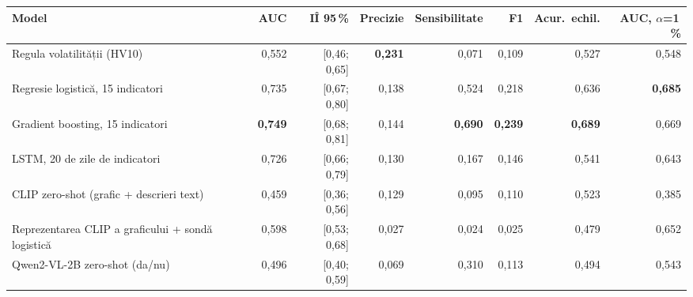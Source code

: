 \begin{tabular}{lrrrrrrr}
\toprule
Model & AUC & IÎ 95\,\% & Precizie & Sensibilitate & F1 & Acur.\ echil. & AUC, $\alpha$=1\,\% \\
\midrule
Regula volatilității (HV10) & 0,552 & [0,46; 0,65] & \textbf{0,231} & 0,071 & 0,109 & 0,527 & 0,548 \\
Regresie logistică, 15 indicatori & 0,735 & [0,67; 0,80] & 0,138 & 0,524 & 0,218 & 0,636 & \textbf{0,685} \\
Gradient boosting, 15 indicatori & \textbf{0,749} & [0,68; 0,81] & 0,144 & \textbf{0,690} & \textbf{0,239} & \textbf{0,689} & 0,669 \\
LSTM, 20 de zile de indicatori & 0,726 & [0,66; 0,79] & 0,130 & 0,167 & 0,146 & 0,541 & 0,643 \\
CLIP zero-shot (grafic + descrieri text) & 0,459 & [0,36; 0,56] & 0,129 & 0,095 & 0,110 & 0,523 & 0,385 \\
Reprezentarea CLIP a graficului + sondă logistică & 0,598 & [0,53; 0,68] & 0,027 & 0,024 & 0,025 & 0,479 & 0,652 \\
Qwen2-VL-2B zero-shot (da/nu) & 0,496 & [0,40; 0,59] & 0,069 & 0,310 & 0,113 & 0,494 & 0,543 \\
\bottomrule
\end{tabular}
